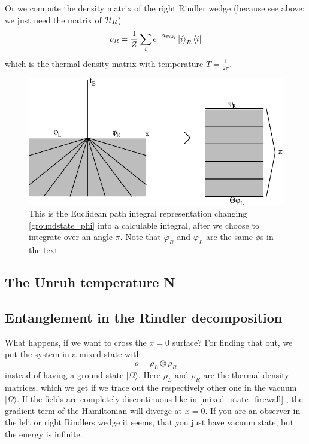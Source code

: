 	Or we compute the density matrix of the right Rindler wedge (because see above: we just need the matrix of $\mathcal{H}_R$)
	\begin{align}
		\rho_R= \frac{1}{Z} \sum_i e^{-2\pi\omega_i} \ket{i}_R \bra{i}
	\end{align}
	which is the thermal density matrix with temperature $T=\frac{1}{2\pi}$. 
	\begin{figure}[tbp]
		\begin{center}
			\includegraphics[scale=1]{eucpath}
			\caption{This is the Euclidean path integral representation changing \eqref{groundstate_phi} into a calculable integral, after we choose to integrate over an angle $\pi$. Note that $\varphi_R$ and $\varphi_L$ are the same $\phi$s in the text.}\label{eucpath}
		\end{center}
	\end{figure}
	\subsection{The Unruh temperature N}
	
	\subsection{Entanglement in the Rindler decomposition \checkmark}
	What happens, if we want to cross the $x=0$ surface? For finding that out, we put the system in a mixed state with
		\begin{equation} \label{mixed_state_firewall}
			\rho=\rho_L \otimes \rho_R
		\end{equation}
	instead of having a ground state $|\Omega\rangle$. Here $\rho_L$ and $\rho_R$ are the thermal density matrices, which we get if we trace out the respectively other one in the vacuum $|\Omega\rangle$.
	If the fields are completely discontinuous like in \eqref{mixed_state_firewall} , the gradient term of the Hamiltonian will diverge at $x=0$. If you are an observer in the left or right Rindlers wedge it seems, that you just have vacuum state, but the energy is infinite. 
	
